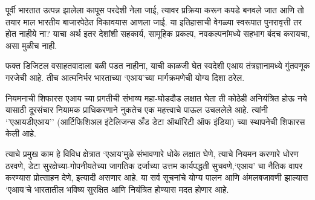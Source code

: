 पूर्वी भारतात उत्पन्न झालेला कापूस परदेशी नेला जाई, त्यावर प्रक्रिया करून कपडे बनवले जात आणि तो तयार माल भारतीय बाजारपेठेत विकावयास आणला जाई. या इतिहासाची वेगळ्या स्वरूपात पुनरावृत्ती तर होत नाहीये ना? याचा अर्थ इतर देशांशी सहकार्य, सामूहिक प्रकल्प, नवकल्पनांमध्ये सहभाग बंदच करायचा, असा मुळीच नाही.

फक्त डिजिटल वसाहतवादाला बळी पडत नाहीना, याची काळजी घेत स्वदेशी एआय तंत्रज्ञानामध्ये गुंतवणूक गरजेची आहे. तीच आत्मनिर्भर भारताच्या ‘एआय’च्या मार्गक्रमणेची योग्य दिशा ठरेल.

नियमनाची शिफारस
एआय च्या प्रगतीची संभाव्य महा-घोडदौड लक्षात घेता ती कोठेही अनियंत्रित होऊ नये यासाठी दूरसंचार नियामक प्राधिकरणाने नुकतेच एक महत्त्वाचे पाऊल उचललेले आहे. त्यांनी ‘’एआयडीएआय’’ (आर्टिफिशिअल इंटेलिजन्स अँड डेटा ऑथॉरिटी ऑफ इंडिया) च्या स्थापनेची शिफारस केली आहे.

त्याचे प्रमुख काम हे विविध क्षेत्रात ‘एआय’मुळे संभावणारे धोके लक्षात घेणे, त्याचे नियमन करणारे धोरण ठरवणे, डेटा सुरक्षेच्या-गोपनीयतेच्या जागतिक दर्जाच्या उत्तम कार्यपद्धती सुचवणे,‘एआय’ चा नैतिक वापर करण्यास प्रोत्साहन देणे, इत्यादी असणार आहे. या सर्व सूचनांचे योग्य पालन आणि अंमलबजावणी झाल्यास ‘एआय’चे भारतातील भविष्य सुरक्षित आणि नियंत्रित होण्यास मदत होणार आहे.

